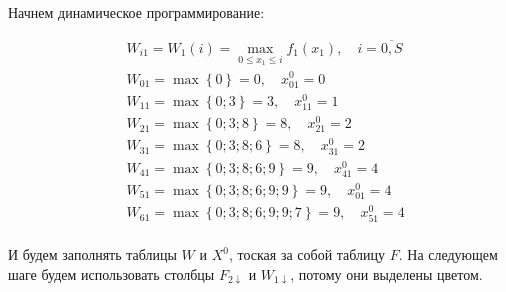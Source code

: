 Начнем динамическое программирование:

\begin{align*}
     & W_{i1} = W_1(i) = \max\limits_{0 \leq x_1 \leq i} f_1(x_1), \quad i = \overline{0, S} \\
     & W_{01} = \max \left\{0\right\} = 0, \quad x_{01}^0 = 0                                \\
     & W_{11} = \max \left\{0; 3\right\} = 3, \quad x_{11}^0 = 1                             \\
     & W_{21} = \max \left\{0; 3; 8\right\} = 8, \quad x_{21}^0 = 2                          \\
     & W_{31} = \max \left\{0; 3; 8; 6\right\} = 8, \quad x_{31}^0 = 2                       \\
     & W_{41} = \max \left\{0; 3; 8; 6; 9\right\} = 9, \quad x_{41}^0 = 4                    \\
     & W_{51} = \max \left\{0; 3; 8; 6; 9; 9\right\} = 9, \quad x_{01}^0 = 4                 \\
     & W_{61} = \max \left\{0; 3; 8; 6; 9; 9; 7\right\} = 9, \quad x_{51}^0 = 4              \\
\end{align*}

И будем заполнять таблицы $W$ и $X^0$, тоская за собой таблицу $F$. На следующем шаге будем использовать столбцы $F_{2 \downarrow}$ и $W_{1 \downarrow}$, потому они выделены цветом.

